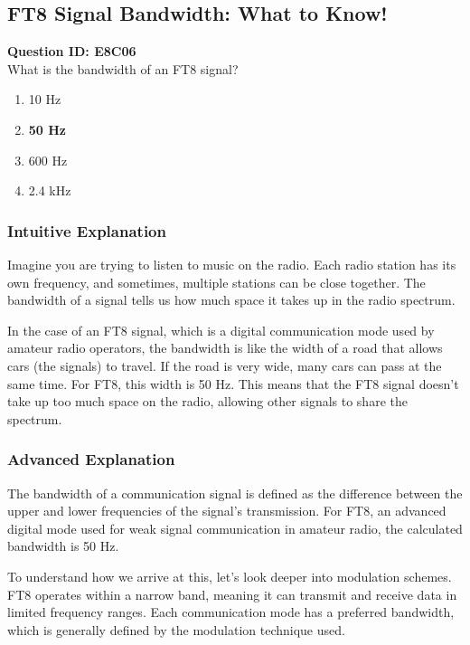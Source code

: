 \subsection{FT8 Signal Bandwidth: What to Know!}

\begin{tcolorbox}
\textbf{Question ID: E8C06} \\
What is the bandwidth of an FT8 signal? \\
\begin{enumerate}[label=\Alph*.]
    \item 10 Hz
    \item \textbf{50 Hz}
    \item 600 Hz
    \item 2.4 kHz
\end{enumerate}
\end{tcolorbox}

\subsubsection{Intuitive Explanation}
Imagine you are trying to listen to music on the radio. Each radio station has its own frequency, and sometimes, multiple stations can be close together. The bandwidth of a signal tells us how much space it takes up in the radio spectrum. 

In the case of an FT8 signal, which is a digital communication mode used by amateur radio operators, the bandwidth is like the width of a road that allows cars (the signals) to travel. If the road is very wide, many cars can pass at the same time. For FT8, this width is 50 Hz. This means that the FT8 signal doesn’t take up too much space on the radio, allowing other signals to share the spectrum.

\subsubsection{Advanced Explanation}
The bandwidth of a communication signal is defined as the difference between the upper and lower frequencies of the signal's transmission. For FT8, an advanced digital mode used for weak signal communication in amateur radio, the calculated bandwidth is 50 Hz.

To understand how we arrive at this, let's look deeper into modulation schemes. FT8 operates within a narrow band, meaning it can transmit and receive data in limited frequency ranges. Each communication mode has a preferred bandwidth, which is generally defined by the modulation technique used.

